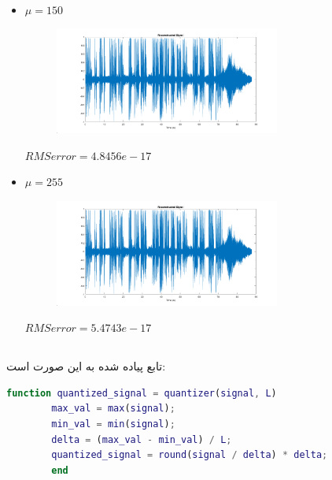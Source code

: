 \documentclass[a4paper]{article}
\begin{document}
\begin{itemize}
	\item 
	$\mu = 150$
	\begin{figure}[H]
		\includegraphics[width=0.7\textwidth]{comsys_fig63.png}\\ 
		\centering
	\end{figure}
	\begin{flushleft}
		$RMS error = 4.8456e-17$
	\end{flushleft}
	
	\item 
	$\mu = 255$
	\begin{figure}[H]
		\includegraphics[width=0.7\textwidth]{comsys_fig64.png}\\ 
		\centering
	\end{figure}
	\begin{flushleft}
		$RMS error = 5.4743e-17$
	\end{flushleft}
	
	
\end{itemize}
\subsection{}
تابع پیاده شده به این صورت است:
\begin{latin*}
	\begin{lstlisting}[language=Matlab]
		function quantized_signal = quantizer(signal, L)
		max_val = max(signal);
		min_val = min(signal);
		delta = (max_val - min_val) / L;
		quantized_signal = round(signal / delta) * delta;
		end
	\end{lstlisting}
\end{latin*}
\end{document}
